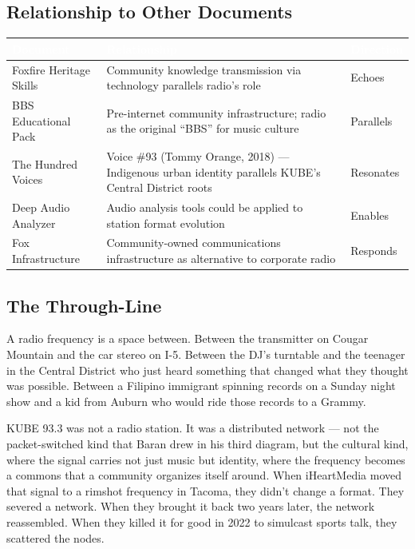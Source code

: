 \documentclass[11pt,letterpaper]{article}
\newcommand{\tableheader}[1]{\textbf{\sffamily\textcolor{white}{#1}}}
\begin{document}
\subsection{Relationship to Other Documents}

\begin{center}
\begin{tabularx}{\textwidth}{L{4cm}XC{2.5cm}}
\toprule
{}
\tableheader{Document} & \tableheader{Relationship} & \tableheader{Direction} \\
\midrule
Foxfire Heritage Skills & Community knowledge transmission via technology parallels radio's role & Echoes \\
BBS Educational Pack & Pre-internet community infrastructure; radio as the original ``BBS'' for music culture & Parallels \\
The Hundred Voices & Voice \#93 (Tommy Orange, 2018) --- Indigenous urban identity parallels KUBE's Central District roots & Resonates \\
Deep Audio Analyzer & Audio analysis tools could be applied to station format evolution & Enables \\
Fox Infrastructure & Community-owned communications infrastructure as alternative to corporate radio & Responds \\
\bottomrule
\end{tabularx}
\end{center}

\subsection{The Through-Line}

A radio frequency is a space between. Between the transmitter on Cougar Mountain and the car stereo on I-5. Between the DJ's turntable and the teenager in the Central District who just heard something that changed what they thought was possible. Between a Filipino immigrant spinning records on a Sunday night show and a kid from Auburn who would ride those records to a Grammy.

KUBE 93.3 was not a radio station. It was a distributed network --- not the packet-switched kind that Baran drew in his third diagram, but the cultural kind, where the signal carries not just music but identity, where the frequency becomes a commons that a community organizes itself around. When iHeartMedia moved that signal to a rimshot frequency in Tacoma, they didn't change a format. They severed a network. When they brought it back two years later, the network reassembled. When they killed it for good in 2022 to simulcast sports talk, they scattered the nodes.
\end{document}

